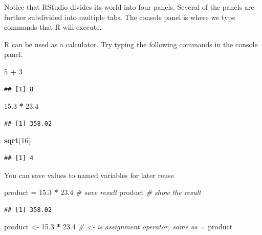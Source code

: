 \documentclass[]{book}
\newenvironment{Shaded}{\begin{snugshade}}{\end{snugshade}}
\newcommand{\CommentTok}[1]{\textcolor[rgb]{0.56,0.35,0.01}{\textit{#1}}}
\newcommand{\DecValTok}[1]{\textcolor[rgb]{0.00,0.00,0.81}{#1}}
\newcommand{\FloatTok}[1]{\textcolor[rgb]{0.00,0.00,0.81}{#1}}
\newcommand{\KeywordTok}[1]{\textcolor[rgb]{0.13,0.29,0.53}{\textbf{#1}}}
\newcommand{\NormalTok}[1]{#1}
\newcommand{\OperatorTok}[1]{\textcolor[rgb]{0.81,0.36,0.00}{\textbf{#1}}}
\newcommand{\StringTok}[1]{\textcolor[rgb]{0.31,0.60,0.02}{#1}}
\begin{document}
Notice that RStudio divides its world into four panels. Several of the panels are further subdivided into multiple tabs.
The console panel is where we type commands that R will execute.

R can be used as a calculator. Try typing the following commands in the console panel.

\begin{Shaded}
\begin{Highlighting}[]
\DecValTok{5} \OperatorTok{+}\StringTok{ }\DecValTok{3}
\end{Highlighting}
\end{Shaded}

\begin{verbatim}
## [1] 8
\end{verbatim}

\begin{Shaded}
\begin{Highlighting}[]
\FloatTok{15.3} \OperatorTok{*}\StringTok{ }\FloatTok{23.4}
\end{Highlighting}
\end{Shaded}

\begin{verbatim}
## [1] 358.02
\end{verbatim}

\begin{Shaded}
\begin{Highlighting}[]
\KeywordTok{sqrt}\NormalTok{(}\DecValTok{16}\NormalTok{)}
\end{Highlighting}
\end{Shaded}

\begin{verbatim}
## [1] 4
\end{verbatim}

You can save values to named variables for later reuse

\begin{Shaded}
\begin{Highlighting}[]
\NormalTok{product =}\StringTok{ }\FloatTok{15.3} \OperatorTok{*}\StringTok{ }\FloatTok{23.4}       \CommentTok{# save result}
\NormalTok{product                     }\CommentTok{# show the result}
\end{Highlighting}
\end{Shaded}

\begin{verbatim}
## [1] 358.02
\end{verbatim}

\begin{Shaded}
\begin{Highlighting}[]
\NormalTok{product <-}\StringTok{ }\FloatTok{15.3} \OperatorTok{*}\StringTok{ }\FloatTok{23.4}      \CommentTok{# <- is assignment operator, same as =}
\NormalTok{product                     }
\end{Highlighting}
\end{Shaded}
\end{document}
